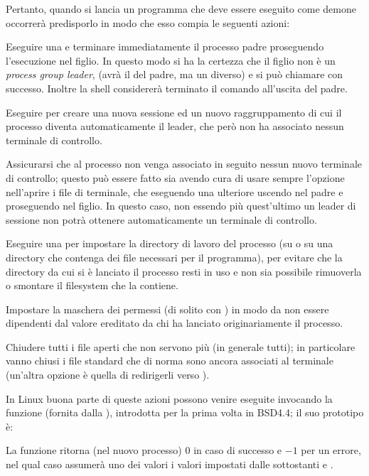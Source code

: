 Pertanto, quando si lancia un programma che deve essere eseguito come demone
occorrerà predisporlo in modo che esso compia le seguenti azioni:
\begin{enumerate*}
\item Eseguire una  e terminare immediatamente il processo padre
  proseguendo l'esecuzione nel figlio.  In questo modo si ha la certezza che
  il figlio non è un \textit{process group leader}, (avrà il  del
  padre, ma un  diverso) e si può chiamare  con
  successo. Inoltre la shell considererà terminato il comando all'uscita del
  padre.
\item Eseguire  per creare una nuova sessione ed un nuovo
  raggruppamento di cui il processo diventa automaticamente il leader, che
  però non ha associato nessun terminale di controllo.
\item Assicurarsi che al processo non venga associato in seguito nessun nuovo
  terminale di controllo; questo può essere fatto sia avendo cura di usare
  sempre l'opzione  nell'aprire i file di terminale, che
  eseguendo una ulteriore  uscendo nel padre e proseguendo nel
  figlio. In questo caso, non essendo più quest'ultimo un leader di sessione
  non potrà ottenere automaticamente un terminale di controllo.
\item Eseguire una  per impostare la directory di lavoro del
  processo (su \file{/} o su una directory che contenga dei file necessari per
  il programma), per evitare che la directory da cui si è lanciato il processo
  resti in uso e non sia possibile rimuoverla o smontare il filesystem che la
  contiene.
\item Impostare la maschera dei permessi (di solito con ) in
  modo da non essere dipendenti dal valore ereditato da chi ha lanciato
  originariamente il processo.
\item Chiudere tutti i file aperti che non servono più (in generale tutti); in
  particolare vanno chiusi i file standard che di norma sono ancora associati
  al terminale (un'altra opzione è quella di redirigerli verso
  ).
\end{enumerate*}


In Linux buona parte di queste azioni possono venire eseguite invocando la
funzione  (fornita dalla ), introdotta per la prima
volta in BSD4.4; il suo prototipo è:

\begin{funcproto}{
}

{La funzione ritorna (nel nuovo processo) $0$ in caso di successo e $-1$ per
  un errore, nel qual caso  assumerà uno dei valori i
    valori impostati dalle sottostanti  e .}
\end{funcproto}


